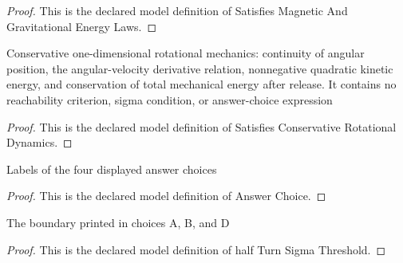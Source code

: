 \begin{proof}
  This is the declared model definition of Satisfies Magnetic And Gravitational Energy Laws.
\end{proof}
\begin{definition}
  \label{def:physics:phyx-mini-0954:phyxminiproblems-problemphyxmini0954-satisfiesconservativerotationaldynamics}
  Conservative one-dimensional rotational mechanics: continuity of angular position, the angular-velocity derivative relation, nonnegative quadratic kinetic energy, and conservation of total mechanical energy after release. It contains no reachability criterion, sigma condition, or answer-choice expression
\end{definition}
\begin{proof}
  This is the declared model definition of Satisfies Conservative Rotational Dynamics.
\end{proof}
\begin{definition}
  \label{def:physics:phyx-mini-0954:phyxminiproblems-problemphyxmini0954-answerchoice}
  Labels of the four displayed answer choices
\end{definition}
\begin{proof}
  This is the declared model definition of Answer Choice.
\end{proof}
\begin{definition}
  \label{def:physics:phyx-mini-0954:phyxminiproblems-problemphyxmini0954-halfturnsigmathreshold}
  The boundary printed in choices A, B, and D
\end{definition}
\begin{proof}
  This is the declared model definition of half Turn Sigma Threshold.
\end{proof}
